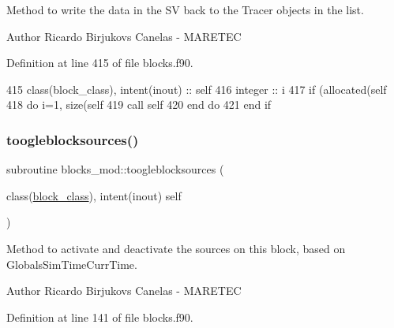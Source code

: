 Method to write the data in the SV back to the Tracer objects in the list. 

\begin{DoxyAuthor}{Author}
Ricardo Birjukovs Canelas -\/ M\+A\+R\+E\+T\+EC 
\end{DoxyAuthor}


Definition at line 415 of file blocks.\+f90.


\begin{DoxyCode}
415     \textcolor{keywordtype}{class}(block\_class), \textcolor{keywordtype}{intent(inout)} :: self
416     \textcolor{keywordtype}{integer} :: i
417     \textcolor{keywordflow}{if} (\textcolor{keyword}{allocated}(self%
418         \textcolor{keywordflow}{do} i=1, \textcolor{keyword}{size}(self%
419             \textcolor{keyword}{call }self%
420 \textcolor{keywordflow}{        end do}
421 \textcolor{keywordflow}{    end if}
\end{DoxyCode}
\mbox{\label{namespaceblocks__mod_ab9e57cbf0103b632b2b2dfa4e4d4139c}} 
\subsubsection{\texorpdfstring{toogleblocksources()}{toogleblocksources()}}
{\footnotesize\ttfamily subroutine blocks\+\_\+mod\+::toogleblocksources (\begin{DoxyParamCaption}\item[{class(\mbox{\hyperlink{structblocks__mod_1_1block__class}{block\+\_\+class}}), intent(inout)}]{self }\end{DoxyParamCaption})\hspace{0.3cm}{\ttfamily [private]}}



Method to activate and deactivate the sources on this block, based on GlobalsSim\+TimeCurr\+Time. 

\begin{DoxyAuthor}{Author}
Ricardo Birjukovs Canelas -\/ M\+A\+R\+E\+T\+EC 
\end{DoxyAuthor}


Definition at line 141 of file blocks.\+f90.


